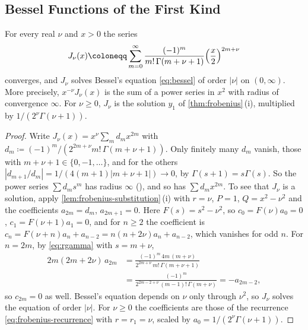 \subsection{Bessel Functions of the First Kind}

\begin{theorem}
\label{thm:bessel-j}
For every real $\nu$ and $x>0$ the series
\begin{equation}
J_\nu(x)\coloneqq\sum_{m=0}^\infty\frac{(-1)^m}{m!\,\Gamma(m+\nu+1)}\Bigl(\frac x2\Bigr)^{2m+\nu}
\label{eq:bessel-j}
\end{equation}
converges, and $J_\nu$ solves Bessel's equation \eqref{eq:bessel} of order $|\nu|$ on $(0,\infty)$. More precisely, $x^{-\nu}J_\nu(x)$ is the sum of a power series in $x^2$ with radius of convergence $\infty$. For $\nu\ge0$, $J_\nu$ is the solution $y_1$ of \cref{thm:frobenius}\,(i), multiplied by $1/(2^\nu\Gamma(\nu+1))$.
\end{theorem}

\begin{proof}
Write $J_\nu(x)=x^\nu\sum_md_mx^{2m}$ with $d_m\coloneqq(-1)^m/(2^{2m+\nu}m!\,\Gamma(m+\nu+1))$. Only finitely many $d_m$ vanish, those with $m+\nu+1\in\{0,-1,\ldots\}$, and for the others $|d_{m+1}/d_m|=1/(4(m+1)|m+\nu+1|)\to0$, by $\Gamma(s+1)=s\Gamma(s)$. So the power series $\sum d_ms^m$ has radius $\infty$ (), and so has $\sum d_mx^{2m}$. To see that $J_\nu$ is a solution, apply \cref{lem:frobenius-substitution}\,(i) with $r=\nu$, $P=1$, $Q=x^2-\nu^2$ and the coefficients $a_{2m}=d_m$, $a_{2m+1}=0$. Here $F(s)=s^2-\nu^2$, so $c_0=F(\nu)a_0=0$, $c_1=F(\nu+1)a_1=0$, and for $n\ge2$ the coefficient is $c_n=F(\nu+n)a_n+a_{n-2}=n(n+2\nu)a_n+a_{n-2}$, which vanishes for odd $n$. For $n=2m$, by \eqref{eq:rgamma} with $s=m+\nu$,
\begin{align*}
2m(2m+2\nu)\,a_{2m}&=\frac{(-1)^m\,4m\,(m+\nu)}{2^{2m+\nu}\,m!\,\Gamma(m+\nu+1)}\\
&=\frac{(-1)^m}{2^{2m-2+\nu}\,(m-1)!\,\Gamma(m+\nu)}=-a_{2m-2},
\end{align*}
so $c_{2m}=0$ as well. Bessel's equation depends on $\nu$ only through $\nu^2$, so $J_\nu$ solves the equation of order $|\nu|$. For $\nu\ge0$ the coefficients are those of the recurrence \eqref{eq:frobenius-recurrence} with $r=r_1=\nu$, scaled by $a_0=1/(2^\nu\Gamma(\nu+1))$.
\end{proof}

